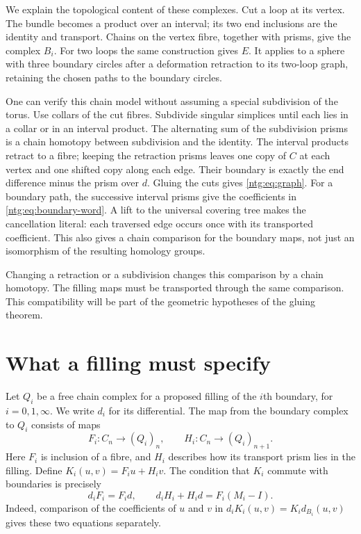 We explain the topological content of these complexes. Cut a loop at
its vertex. The bundle becomes a product over an interval; its two end
inclusions are the identity and transport. Chains on the vertex fibre,
together with prisms, give the complex $B_i$. For two loops the same
construction gives $E$. It applies to a sphere with three boundary
circles after a deformation retraction to its two-loop graph, retaining
the chosen paths to the boundary circles.

One can verify this chain model without assuming a special subdivision
of the torus. Use collars of the cut fibres. Subdivide singular simplices
until each lies in a collar or in an interval product. The alternating
sum of the subdivision prisms is a chain homotopy between subdivision
and the identity. The interval products retract to a fibre; keeping the
retraction prisms leaves one copy of $C$ at each vertex and one shifted
copy along each edge. Their boundary is exactly the end difference
minus the prism over $d$. Gluing the cuts gives
\eqref{ntg:eq:graph}. For a boundary path, the successive interval prisms
give the coefficients in \eqref{ntg:eq:boundary-word}. A lift to the
universal covering tree makes the cancellation literal: each traversed
edge occurs once with its transported coefficient. This also gives a
chain comparison for the boundary maps, not just an isomorphism of
the resulting homology groups.

Changing a retraction or a subdivision changes this comparison by a
chain homotopy. The filling maps must be transported through the same
comparison. This compatibility will be part of the geometric
hypotheses of the gluing theorem.

\section{What a filling must specify}

Let $Q_i$ be a free chain complex for a proposed filling of the $i$th
boundary, for $i=0,1,\infty$. We write $d_i$ for its differential.
The map from the boundary complex to $Q_i$ consists of maps
\begin{equation}\label{ntg:eq:filling-data}
 F_i:C_n\longrightarrow(Q_i)_n,\qquad
 H_i:C_n\longrightarrow(Q_i)_{n+1}.
\end{equation}
Here $F_i$ is inclusion of a fibre, and $H_i$ describes how its
transport prism lies in the filling. Define
$K_i(u,v)=F_iu+H_iv$. The condition that $K_i$ commute with
boundaries is precisely
\begin{equation}\label{ntg:eq:homotopy}
 d_iF_i=F_id,\qquad d_iH_i+H_id=F_i(M_i-I).
\end{equation}
Indeed, comparison of the coefficients of $u$ and $v$ in
$d_iK_i(u,v)=K_id_{B_i}(u,v)$ gives these two equations separately.

